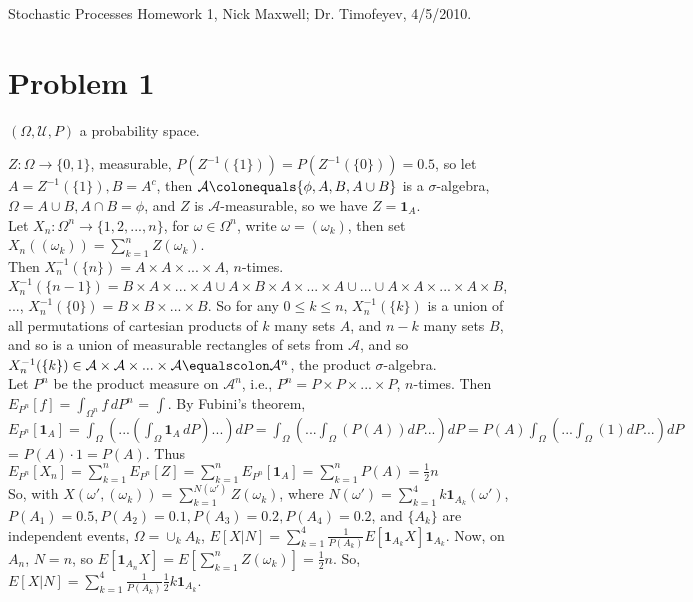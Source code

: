 \documentclass[12pt]{article}
\newcommand{\A}[0] { \mathcal{A} }
\newcommand{\U}[0] { \mathcal{U} }
\newcommand{\om}[0] { \omega }
\newcommand{\Om}[0] { \Omega }
\newcommand{\rarw}[0] { \rightarrow }
\newcommand{ \defeq }[0] { \colonequals }
\newcommand{ \eqdef }[0] { \equalscolon }
\newcommand{ \cf }[1] { \mathbf{1}_{#1} }
\begin{document}
Stochastic Processes Homework 1, Nick Maxwell; Dr. Timofeyev, 4/5/2010. \\






\section*{Problem 1}

$(\Om, \U, P)$ a probability space.

$Z: \Om \rarw \{ 0, 1\}$, measurable, $P(Z^{-1}(\{1\})) = P(Z^{-1}(\{0\})) = 0.5 $, so let $A = Z^{-1}(\{1\}), B = A^c$, then $\A \defeq \{ \phi, A, B, A \cup B \}$ is a $\sigma$-algebra, $\Om = A \cup B, A \cap B = \phi$, and $Z$ is $\A$-measurable, so we have $Z = \cf{A}$.\\

\noindent
Let $X_n : \Om^n \rarw \{ 1,2,...,n\}$, for $\om \in \Om^n$, write $\om = (\om_k)$, then set $X_n( (\om_k) ) = \sum_{k=1}^n Z(\om_k)$. \\

\noindent 
Then $X_n^{-1}(\{n\}) = A \times A \times ... \times A$, $n$-times. $X_n^{-1}(\{n-1\}) = B \times A \times ... \times A \cup A \times B \times A \times ... \times A \cup ... \cup  A \times A \times ... \times A \times B$, $...$, $X_n^{-1}(\{0\}) = B \times B \times ... \times B$. So for any $0 \le k \le n$, $X_n^{-1}(\{k\})$ is a union of all permutations of cartesian products of $k$ many sets $A$, and $n-k$ many sets $B$, and so is a union of measurable rectangles of sets from $\A$, and so  $X_n^{-1}(\{k\}) \in \A \times \A \times ... \times \A \eqdef \A^n$, the product $\sigma$-algebra.\\

\noindent
Let $P^n$ be the product measure on $\A^n$,  i.e., $P^n = P \times P \times ... \times P$, $n$-times. Then $E_{P^n}[ f ] = \int_{\Om^n} f \, dP^n$ = 
$ \int  $. By Fubini's theorem, $E_{P^n}[ \cf{A} ] = \int_\Om \left( ... \left( \int_\Om \cf{A} \, dP  \right) ... \right)  dP  =  \int_\Om \left( ...  \int_\Om  \left( P(A)  \right) dP ... \right)  dP = P(A)  \int_\Om \left( ...  \int_\Om  \left( 1  \right) dP ... \right)  dP $ = $P(A) \cdot 1 = P(A)$. Thus $ E_{P^n}[ X_n ] = \sum_{k=1} ^n  E_{P^n}[ Z ] = \sum_{k=1} ^n  E_{P^n}[ \cf{A} ] =  \sum_{k=1} ^n  P(A) = \frac{1}{2} n $\\

\noindent
So, with $X(\om', (\om_k)) = \sum_{k=1}^{N(\om')} Z(\om_k)$, where $N(\om') = \sum_{k=1}^4 k \cf{A_k}(\om')$, $P(A_1) = 0.5, P(A_2) = 0.1, P(A_3) = 0.2, P(A_4) = 0.2$, and $\{A_k\}$ are independent events, $\Om = \cup_k A_k$, $E[X|N] = \sum_{k=1}^4 \frac{1}{P(A_k)} E[\cf{A_k}X] \cf{A_k}$. Now, on $A_n$, $N = n$, so $E[\cf{A_n}X ]= E \left[ \sum_{k=1}^{n} Z(\om_k) \right ]= \frac{1}{2} n$. So, $E[X | N] =  \sum_{k=1}^4 \frac{1}{P(A_k)} \frac{1}{2} k \cf{A_k} $. \\
\end{document}
